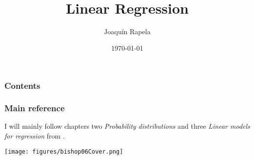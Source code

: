 \documentclass[11pt]{beamer}
\title{Linear Regression}
\author{Joaqu\'{i}n Rapela} %
\institute[GCNU, UCL] %
{
Gatsby Computational Neuroscience Unit\\University College London %
}
\date{\today} %
\begin{document}
\begin{frame}
\titlepage %
\end{frame}

\begin{frame}
\frametitle{Contents} %
\tableofcontents %
\end{frame}

\begin{frame}
\frametitle{Main reference} %

    I will mainly follow chapters two \textit{Probability distributions} and
    three \textit{Linear models for regression} from
    \citet{bishop06}.

    \begin{center}
        \texttt{[image: figures/bishop06Cover.png]}
    \end{center}

\end{frame}

\begin{comment}
\begin{frame}
\frametitle{Main lecture goals}

    \begin{figure}
        \begin{tikzpicture}
            \node[ellipse,align=center,anchor=north,fill=blue!20,draw=blue] (foundations) {Mathematical\\foundations\\of probability};
            \node[ellipse,align=center,anchor=north,fill=orange!20,draw=orange] [below left=of foundations] (proofs) {Proofs\\(beautiful)};
            \node[ellipse,align=center,anchor=north,fill=orange!20,draw=orange] [below=of foundations] (examples) {Examples\\(fun)};
            \node[ellipse,align=center,anchor=north,fill=orange!20,draw=orange] [below right=of foundations] (simulations) {Simulations\\(useful)};
            \path[-] (foundations) edge node [] {} (proofs);
            \path[-] (foundations) edge node [] {} (examples);
            \path[-] (foundations) edge node [] {} (simulations);
        \end{tikzpicture}
    \end{figure }

\end{frame}
\end{comment}
\end{document}
